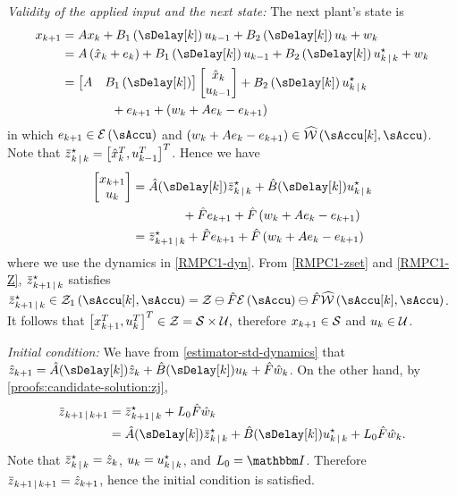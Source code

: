\noindent\textit{Validity of the applied input and the next state:}
%
The next plant's state is 
\begin{align*}
x_{k+1} & =Ax_{k}+B_{1}\left(\sDelay[k]\right)u_{k-1}+B_{2}\left(\sDelay[k]\right)u_{k}+w_{k}\\
 & =A\left(\hat{x}_{k}+e_{k}\right)+B_{1}\left(\sDelay[k]\right)u_{k-1}+B_{2}\left(\sDelay[k]\right)u_{k\Given k}^{\star}+w_{k}\\
 & =\begin{bmatrix}A & B_{1}\left(\sDelay[k]\right)\end{bmatrix}\begin{bmatrix}\hat{x}_{k}\\
u_{k-1}
\end{bmatrix}+B_{2}\left(\sDelay[k]\right)u_{k\Given k}^{\star} \\
&\qquad\qquad + e_{k+1}+\left(w_{k}+Ae_{k}-e_{k+1}\right)
\end{align*}
in which $e_{k+1}\in\ESet\left(\sAccu\right)$ and $\left(w_{k}+Ae_{k}-e_{k+1}\right)\in\WhSet\left(\sAccu[k],\sAccu\right)$.
Note that $\Nom z_{k\Given k}^{\star}=\left[\hat{x}_{k}^{T},u_{k-1}^{T}\right]^{T}$.
Hence we have
\begin{align*}
\begin{bmatrix}x_{k+1}\\
u_{k}
\end{bmatrix} & =\hat{A}(\sDelay[k])\Nom z_{k\Given k}^{\star}+\hat{B}(\sDelay[k])u_{k\Given k}^{\star}\\
&\qquad\qquad +\hat{F}e_{k+1}+\hat{F}\left(w_{k}+Ae_{k}-e_{k+1}\right)\\
 & =\Nom z_{k+1\Given k}^{\star}+\hat{F}e_{k+1}+\hat{F}\left(w_{k}+Ae_{k}-e_{k+1}\right)
\end{align*}
where we use the dynamics in \eqref{RMPC1-dyn}. From \eqref{RMPC1-zset}
and \eqref{RMPC1-Z}, $\Nom z_{k+1\Given k}^{\star}$ satisfies $\Nom z_{k+1\Given k}^{\star}\in\ZSet_{1}\left(\sAccu[k],\sAccu\right)=\ZSet\ominus\hat{F}\ESet\left(\sAccu\right)\ominus\hat{F}\WhSet\left(\sAccu[k],\sAccu\right)$.
It follows that
\(
\left[ x_{k+1}^{T}, u_{k}^{T} \right]^{T} \in \mathcal{Z} = \mathcal{S}\times\mathcal{U}\text{,}
\)
therefore  $x_{k+1}\in\mathcal{S}$ and $u_{k}\in\mathcal{U}$.


\noindent\textit{Initial condition:}
%
We have from \eqref{estimator-std-dynamics} that $\hat{z}_{k+1}=\hat{A}(\sDelay[k])\hat{z}_{k}+\hat{B}(\sDelay[k])u_{k}+\hat{F}\hat{w}_{k}$.
On the other hand, by \eqref{proofs:candidate-solution:zj},
\begin{align*}
\Nom z_{k+1\Given k+1} & =\Nom z_{k+1\Given k}^{\star}+L_{0}\hat{F}\hat{w}_{k}\\
 & =\hat{A}(\sDelay[k])\Nom z_{k\Given k}^{\star}+\hat{B}(\sDelay[k])u_{k\Given k}^{\star}+L_{0}\hat{F}\hat{w}_{k}\text{.}
\end{align*}
Note that $\Nom z_{k\Given k}^{\star}=\hat{z}_{k}$, $u_{k}=u_{k\,|\, k}^{\star}$,
and $L_{0}=\IdentityMatrix$. Therefore $\Nom z_{k+1\Given k+1}=\hat{z}_{k+1}$,
hence the initial condition is satisfied.


